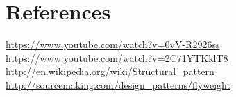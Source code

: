 \chapter{References}
\url{https://www.youtube.com/watch?v=0vV-R2926ss}\\
\url{https://www.youtube.com/watch?v=2C71YTKklT8}\\
\url{http://en.wikipedia.org/wiki/Structural_pattern}\\
\url{http://sourcemaking.com/design_patterns/flyweight}